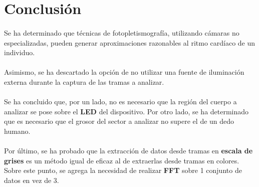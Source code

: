 \documentclass[12pt, twocolumn]{article}
\begin{document}
	\section{Conclusión}
	
	\paragraph{} Se ha determinado que técnicas de fotopletismografía, utilizando cámaras no especializadas, pueden generar aproximaciones razonables al ritmo cardíaco de un individuo.
	
	\paragraph{} Asimismo, se ha descartado la opción de no utilizar una fuente de iluminación externa durante la captura de las tramas a analizar.
	
	\paragraph{} Se ha concluido que, por un lado, no es necesario que la región del cuerpo a analizar se pose sobre el \textbf{LED} del dispositivo. Por otro lado, se ha determinado que es necesario que el grosor del sector a analizar no supere el de un dedo humano. 
	
	\paragraph{} Por último, se ha probado que la extracción de datos desde tramas en \textbf{escala de grises} es un método igual de eficaz al de extraerlas desde tramas en colores. Sobre este punto, se agrega la necesidad de realizar \textbf{FFT} sobre 1 conjunto de datos en vez de 3.
	
	
	
\end{document}
